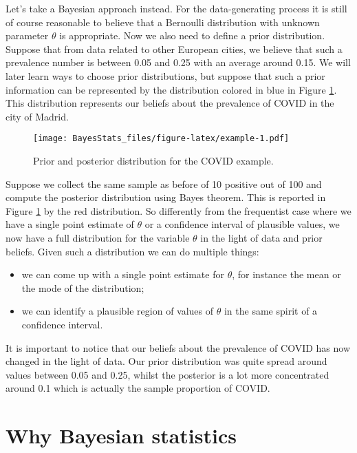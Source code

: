 \documentclass[
]{book}
\begin{document}
Let's take a Bayesian approach instead. For the data-generating process it is still of course reasonable to believe that a Bernoulli distribution with unknown parameter \(\theta\) is appropriate. Now we also need to define a prior distribution. Suppose that from data related to other European cities, we believe that such a prevalence number is between 0.05 and 0.25 with an average around 0.15. We will later learn ways to choose prior distributions, but suppose that such a prior information can be represented by the distribution colored in blue in Figure \ref{fig:example}. This distribution represents our beliefs about the prevalence of COVID in the city of Madrid.

\begin{figure}
\centering
\texttt{[image: BayesStats\_files/figure-latex/example-1.pdf]}
\caption{\label{fig:example}Prior and posterior distribution for the COVID example.}
\end{figure}

Suppose we collect the same sample as before of 10 positive out of 100 and compute the posterior distribution using Bayes theorem. This is reported in Figure \ref{fig:example} by the red distribution. So differently from the frequentist case where we have a single point estimate of \(\theta\) or a confidence interval of plausible values, we now have a full distribution for the variable \(\theta\) in the light of data and prior beliefs. Given such a distribution we can do multiple things:

\begin{itemize}
\item
  we can come up with a single point estimate for \(\theta\), for instance the mean or the mode of the distribution;
\item
  we can identify a plausible region of values of \(\theta\) in the same spirit of a confidence interval.
\end{itemize}

It is important to notice that our beliefs about the prevalence of COVID has now changed in the light of data. Our prior distribution was quite spread around values between 0.05 and 0.25, whilst the posterior is a lot more concentrated around 0.1 which is actually the sample proportion of COVID.

\hypertarget{why-bayesian-statistics}{%
\section{Why Bayesian statistics}\label{why-bayesian-statistics}}
\end{document}
